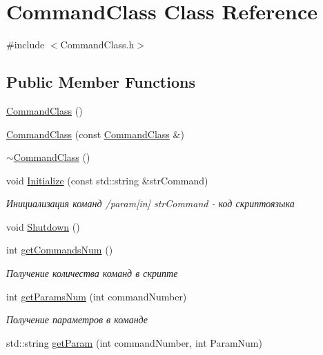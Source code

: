 \hypertarget{class_command_class}{}\section{Command\+Class Class Reference}
\label{class_command_class}


{\ttfamily \#include $<$Command\+Class.\+h$>$}

\subsection*{Public Member Functions}
\begin{DoxyCompactItemize}
\item 
\hyperlink{class_command_class_af2cda2eecc2e6728cc695765f3f55cb1}{Command\+Class} ()
\item 
\hyperlink{class_command_class_a9aff7dc67892ec24992a74c86d7a1355}{Command\+Class} (const \hyperlink{class_command_class}{Command\+Class} \&)
\item 
\hyperlink{class_command_class_aff8cc15df547b14f550df769b4d81931}{$\sim$\+Command\+Class} ()
\item 
void \hyperlink{class_command_class_a34339505fcdae140bd6f137256c76451}{Initialize} (const std\+::string \&str\+Command)
\begin{DoxyCompactList}\small\item\em Инициализация команд /param\mbox{[}in\mbox{]} str\+Command -\/ код скриптоязыка \end{DoxyCompactList}\item 
void \hyperlink{class_command_class_a78052a59a127388c298c6165481d98a6}{Shutdown} ()
\item 
int \hyperlink{class_command_class_aa29401d3b814e59491020b97ce040ef0}{get\+Commands\+Num} ()
\begin{DoxyCompactList}\small\item\em Получение количества команд в скрипте \end{DoxyCompactList}\item 
int \hyperlink{class_command_class_ab987d47061d86a89765dbf8a2eda146f}{get\+Params\+Num} (int command\+Number)
\begin{DoxyCompactList}\small\item\em Получение параметров в команде \end{DoxyCompactList}\item 
std\+::string \hyperlink{class_command_class_ac5cd41b5644c2a0b076b3e7f18b79b1a}{get\+Param} (int command\+Number, int Param\+Num)

\end{DoxyCompactItemize}

